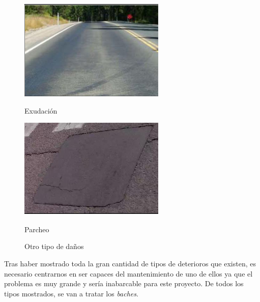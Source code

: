 \begin{figure}[ht!]
	\centering
	\begin{minipage}{0.3\linewidth}
		\centering
		\includegraphics[width=\linewidth]{figs/ex.png}
		\caption*{\centering Exudación }
	\end{minipage}
	\hspace{3 cm}
	\begin{minipage}{0.3\linewidth}
		\centering
		\includegraphics[width=\linewidth]{figs/parcheo.png}
		\caption*{\centering Parcheo }
	\end{minipage}
	
	\caption{Otro tipo de daños}
	\label{fig:otro}
\end{figure}

Tras haber mostrado toda la gran cantidad de tipos de deterioros que existen, es necesario centrarnos en ser capaces del mantenimiento de uno de ellos ya que el problema es muy grande y sería inabarcable para este proyecto. De todos los tipos mostrados, se van a tratar los \textit{baches}.

